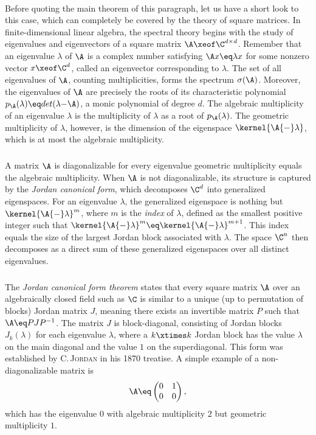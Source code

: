 \documentclass[11pt,twoside]{article}
\begin{document}
\paragraph{} %
Before quoting the main theorem of this paragraph,
let us have a short look to this case,
which can completely be covered by the theory of square matrices.
In finite-dimensional linear algebra,
the spectral theory begins with the study of eigenvalues and eigenvectors
of a square matrix $\A \xeof \C^{d \times d}$.
Remember that an eigenvalue $\lambda$ of $\A$ is a complex number
satisfying $\A x \eq \lambda x$ for some nonzero vector $x \xeof \C^d$,
called an eigenvector corresponding to $\lambda$.
The set of all eigenvalues of $\A$, counting multiplicities,
forms the spectrum $\sigma(\A)$.
Moreover,
the eigenvalues of $\A$ are precisely the roots
of its characteristic polynomial $p_{\A}(\lambda) \eq det(\lambda {-} \A)$,
a monic polynomial of degree $d$.
The algebraic multiplicity of an eigenvalue $\lambda$ is
the multiplicity of $\lambda$ as a root of $p_{\A}(\lambda)$.
The geometric multiplicity of $\lambda$,
however,
is the dimension of the eigenspace $\kernel{\A {-} \lambda}$,
which is at most the algebraic multiplicity.

\subparagraph{} %
A matrix $\A$ is diagonalizable \iff
for every eigenvalue geometric multiplicity equals the algebraic multiplicity.
When $\A$ is not diagonalizable,
its structure is captured by the \textit{Jordan canonical form},
which decomposes $\C^d$ into generalized eigenspaces.
For an eigenvalue $\lambda$,
the generalized eigenspace is nothing but $\kernel{\A{-}\lambda}^m$,
where $m$ is the \textit{index} of $\lambda$,
defined as the smallest positive integer
such that $\kernel{\A{-}\lambda}^m \eq \kernel{\A{-}\lambda}^{m+1}$.
This index equals the size of the largest Jordan block
associated with $\lambda$.
The space $\C^n$ then decomposes as a direct sum
of these generalized eigenspaces over all distinct eigenvalues.

\subparagraph{} %
The \textit{Jordan canonical form theorem} states that
every square matrix $\A$ over an algebraically closed field such as $\C$
is similar to a unique (up to permutation of blocks) Jordan matrix $J$,
meaning there exists an invertible matrix $P$ such that $\A \eq PJP^{-1}$.
The matrix $J$ is block-diagonal,
consisting of Jordan blocks $J_k(\lambda)$ for each eigenvalue $\lambda$,
where a $k \xtimes k$ Jordan block has the value $\lambda$ on the main diagonal
and the value $1$ on the superdiagonal.
This form was established by \textsc{C.\,Jordan} in his 1870 treatise.
A simple example of a non-diagonalizable matrix is
\[
\A \eq \begin{pmatrix} 0 & 1 \\ 0 & 0 \end{pmatrix},
\]
which has the eigenvalue $0$ with algebraic multiplicity $2$
but geometric multiplicity $1$.
\end{document}
